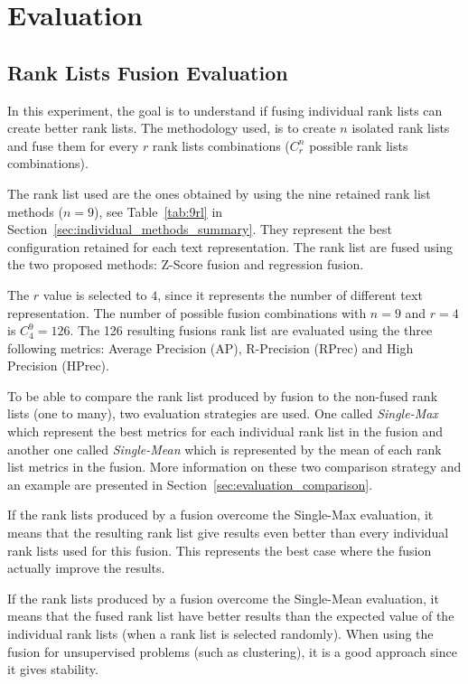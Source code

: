 \section{Evaluation}

\subsection{Rank Lists Fusion Evaluation \label{sec:eval_fusion}}

In this experiment, the goal is to understand if fusing individual rank lists can create better rank lists.
The methodology used, is to create $n$ isolated rank lists and fuse them for every $r$ rank lists combinations ($C^n_r$ possible rank lists combinations).

The rank list used are the ones obtained by using the nine retained rank list methods ($n=9$), see Table~\ref{tab:9rl} in Section~\ref{sec:individual_methods_summary}.
They represent the best configuration retained for each text representation.
The rank list are fused using the two proposed methods: Z-Score fusion and regression fusion.

The $r$ value is selected to $4$, since it represents the number of different text representation.
The number of possible fusion combinations with $n=9$ and $r=4$ is $C^{9}_{4} = 126$.
The 126 resulting fusions rank list are evaluated using the three following metrics: Average Precision (AP), R-Precision (RPrec) and High Precision (HPrec).

To be able to compare the rank list produced by fusion to the non-fused rank lists (one to many), two evaluation strategies are used.
One called \textit{Single-Max} which represent the best metrics for each individual rank list in the fusion and another one called \textit{Single-Mean} which is represented by the mean of each rank list metrics in the fusion.
More information on these two comparison strategy and an example are presented in Section~\ref{sec:evaluation_comparison}.

If the rank lists produced by a fusion overcome the Single-Max evaluation, it means that the resulting rank list give results even better than every individual rank lists used for this fusion.
This represents the best case where the fusion actually improve the results.

If the rank lists produced by a fusion overcome the Single-Mean evaluation, it means that the fused rank list have better results than the expected value of the individual rank lists (when a rank list is selected randomly).
When using the fusion for unsupervised problems (such as clustering), it is a good approach since it gives stability.

